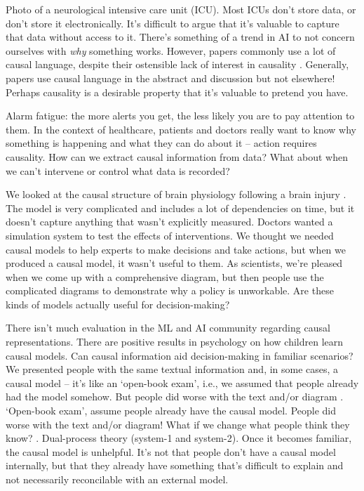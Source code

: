 \begin{affils}
\end{affils}

Photo of a neurological intensive care unit (ICU).
Most ICUs don't store data, or don't store it electronically.
It's difficult to argue that it's valuable to capture that data without access to it.
There's something of a trend in AI to not concern ourselves with \emph{why} something
works.
However, papers commonly use a lot of causal language, despite their ostensible lack of
interest in causality \parencites{Cofield2010}{Han2022}.
Generally, papers use causal language in the abstract and discussion but not elsewhere!
Perhaps causality is a desirable property that it's valuable to pretend you have.

Alarm fatigue: the more alerts you get, the less likely you are to pay attention to
them.
In the context of healthcare, patients and doctors really want to know why something is
happening and what they can do about it -- action requires causality.
How can we extract causal information from data?
What about when we can't intervene or control what data is recorded?

We looked at the causal structure of brain physiology following a brain injury
\parencites{Claassen2016}.
The model is very complicated and includes a lot of dependencies on time, but it
doesn't capture anything that wasn't explicitly measured.
Doctors wanted a simulation system to test the effects of interventions.
We thought we needed causal models to help experts to make decisions and take actions,
but when we produced a causal model, it wasn't useful to them.
As scientists, we're pleased when we come up with a comprehensive diagram, but then
people use the complicated diagrams to demonstrate why a policy is unworkable.
Are these kinds of models actually useful for decision-making?

There isn't much evaluation in the ML and AI community regarding causal
representations.
There are positive results in psychology on how children learn causal models.
Can causal information aid decision-making in familiar scenarios?
We presented people with the same textual information and, in some cases, a causal
model -- it's like an `open-book exam', i.e., we assumed that people already had the
model somehow.
But people did worse with the text and/or diagram \parencites{Zheng2020}.
`Open-book exam', assume people already have the causal model.
People did worse with the text and/or diagram!
What if we change what people think they know?
\parencites{Kleinberg2020}.
Dual-process theory (system-1 and system-2).
Once it becomes familiar, the causal model is unhelpful.
It's not that people don't have a causal model internally, but that they already have
something that's difficult to explain and not necessarily reconcilable with an external
model.

